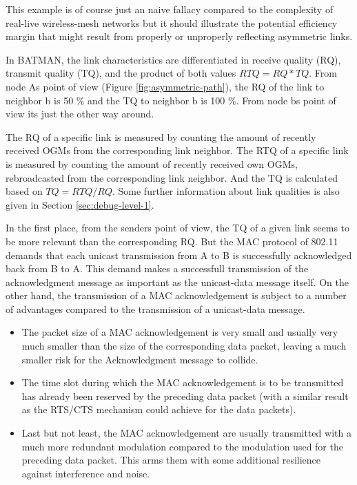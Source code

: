 \documentclass[11pt]{article}
\begin{document}
This example is of course just an naive fallacy compared to the complexity of real-live wireless-mesh networks but it should illustrate the potential efficiency margin that might result from properly or unproperly reflecting asymmetric links.



In BATMAN, the link characteristics are differentiated in receive quality (RQ), transmit quality (TQ), and the product of both values $RTQ = RQ * TQ$.
%
%
From node As point of view (Figure \ref{fig:asymmetric-path}), the RQ of the link to neighbor b is 50 \% and the TQ to neighbor b is 100 \%. From node bs point of view its just the other way around.

The RQ of a specific link is measured by counting the amount of recently received OGMs from the corresponding link neighbor.
%
The RTQ of a specific link is measured by counting the amount of recently received own OGMs, rebroadcasted from the corresponding link neighbor.
%
And the TQ is calculated based on $TQ = RTQ / RQ$.
%
Some further information about link qualities is also given in Section \ref{sec:debug-level-1}.

%
In the first place, from the senders point of view, the TQ of a given link seems to be more relevant than the corresponding RQ.
%
But the MAC protocol of 802.11 \cite{ieee80211} demands that each unicast transmission from A to B is successfully acknowledged back from B to A.
%
This demand makes a successfull transmission of the acknowledgment message as important as the unicast-data message itself.
%
On the other hand, the transmission of a MAC acknowledgement is subject to a number of advantages compared to the transmission of a unicast-data message.

\begin{itemize}
  \item  The packet size of a MAC acknowledgement is very small and usually very much smaller than the size of the corresponding data packet, leaving a much smaller risk for the Acknowledgment message to collide.

 \item The time slot during which the MAC acknowledgement is to be transmitted has already been reserved by the preceding data packet (with a similar result as the RTS/CTS mechanism could achieve for the data packets).

 \item Last but not least, the MAC acknowledgement are usually transmitted with a much more redundant modulation compared to the modulation used for the preceding data packet. This arms them with some additional resilience against interference and noise.

\end{itemize}
\end{document}
